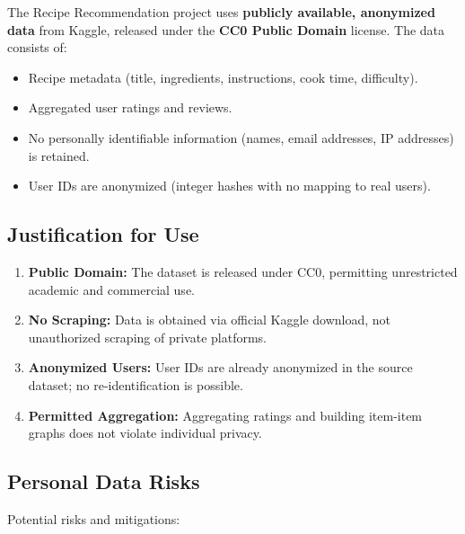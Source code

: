 \documentclass[11pt,a4paper]{article}
\begin{document}
The Recipe Recommendation project uses \textbf{publicly available, anonymized data} from Kaggle, released under the \textbf{CC0 Public Domain} license. The data consists of:

\begin{itemize}
    \item Recipe metadata (title, ingredients, instructions, cook time, difficulty).
    \item Aggregated user ratings and reviews.
    \item No personally identifiable information (names, email addresses, IP addresses) is retained.
    \item User IDs are anonymized (integer hashes with no mapping to real users).
\end{itemize}

\subsection{Justification for Use}

\begin{enumerate}
    \item \textbf{Public Domain:} The dataset is released under CC0, permitting unrestricted academic and commercial use.
    \item \textbf{No Scraping:} Data is obtained via official Kaggle download, not unauthorized scraping of private platforms.
    \item \textbf{Anonymized Users:} User IDs are already anonymized in the source dataset; no re-identification is possible.
    \item \textbf{Permitted Aggregation:} Aggregating ratings and building item-item graphs does not violate individual privacy.
\end{enumerate}

\subsection{Personal Data Risks}

Potential risks and mitigations:
\end{document}
